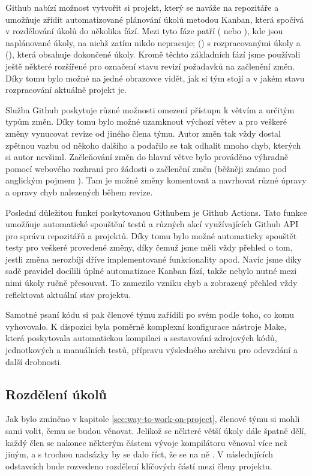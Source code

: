\documentclass[11pt,a4paper]{article}
\begin{document}
Github nabízí možnost vytvořit si projekt, který se naváže na repozitáře a umožňuje zřídit automatizované plánování úkolů metodou Kanban, která spočívá v rozdělování úkolů do několika fází. Mezi tyto fáze patří  ( nebo ), kde jsou naplánované úkoly, na nichž zatím nikdo nepracuje;  () s rozpracovanými úkoly a  (), která obsahuje dokončené úkoly. Kromě těchto základních fází jsme používali ještě některé rozšířené pro označení stavu revizí požadavků na začlenění změn. Díky tomu bylo možné na jedné obrazovce vidět, jak si tým stojí a v jakém stavu rozpracování aktuálně projekt je.

Služba Github poskytuje různé možnosti omezení přístupu k větvím a určitým typům změn. Díky tomu bylo možné uzamknout výchozí větev a pro veškeré změny vynucovat revize od jiného člena týmu. Autor změn tak vždy dostal zpětnou vazbu od někoho dalšího a podařilo se tak odhalit mnoho chyb, kterých si autor nevšiml. Začleňování změn do hlavní větve bylo prováděno výhradně pomocí webového rozhraní pro žádosti o začlenění změn (běžněji známo pod anglickým pojmem ). Tam je možné změny komentovat a navrhovat různé úpravy a opravy chyb nalezených během revize.

Poslední důležitou funkcí poskytovanou Githubem je Github Actions. Tato funkce umožňuje automatické spouštění testů a různých akcí využívajících Github API pro správu repozitářů a projektů. Díky tomu bylo možné automaticky spouštět testy pro veškeré provedené změny, díky čemuž jsme měli vždy přehled o tom, jestli změna nerozbíjí dříve implementované funkcionality apod. Navíc jsme díky sadě pravidel docílili úplné automatizace Kanban fází, takže nebylo nutné mezi nimi úkoly ručně přesouvat. To zamezilo vzniku chyb a zobrazený přehled vždy reflektovat aktuální stav projektu.

Samotné psaní kódu si pak členové týmu zařídili po svém podle toho, co komu vyhovovalo. K dispozici byla poměrně komplexní konfigurace nástroje Make, která poskytovala automatickou kompilaci a sestavování zdrojových kódů, jednotkových a manuálních testů, přípravu výsledného archivu pro odevzdání a další drobnosti.

\subsection{Rozdělení úkolů}
\label{sec:tasks-division}

Jak bylo zmíněno v kapitole \ref{sec:way-to-work-on-project}, členové týmu si mohli sami volit, čemu se budou věnovat. Jelikož se některé větší úkoly dále špatně dělí, každý člen se nakonec některým částem vývoje kompilátoru věnoval více než jiným, a s trochou nadsázky by se dalo říct, že se na ně . V následujících odstavcích bude rozvedeno rozdělení klíčových částí mezi členy projektu.
\end{document}
